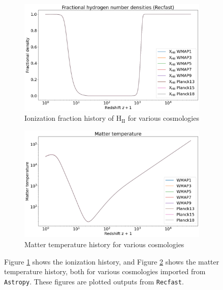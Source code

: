 \documentclass[floats,floatfix,showpacs,amssymb,prd,superscriptaddress,nofootinbib]{revtex4-2} %
\newcommand{\code}{\texttt}
\begin{document}
\begin{figure}[!htbp]
     \centering
     \begin{subfigure}{0.45\textwidth}
         \centering
         \includegraphics[width=\textwidth]{images/ionized_fraction_varied_cosmology.png}
         \caption{Ionization fraction history of H$_{\text{II}}$ for various cosmologies}
         \label{fig:ionized_fraction}
     \end{subfigure}
     \hfill
     \begin{subfigure}{0.45\textwidth}
         \centering
         \includegraphics[width=\textwidth]{images/matter_temperature_varied_cosmology.png}
         \caption{Matter temperature history for various cosmologies}
         \label{fig:matter_temperature_varied_cosmology}
     \end{subfigure}
     \caption{Figure \ref{fig:ionized_fraction} shows the ionization history, and Figure \ref{fig:matter_temperature_varied_cosmology} shows the matter temperature history, both for various cosmologies imported from \code{Astropy}. These figures are plotted outputs from \code{Recfast}.}
     \label{fig:recfast_output_plots}
\end{figure}
\end{document}
